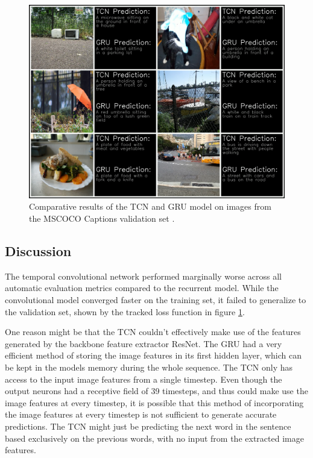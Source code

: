 \documentclass[a4paper, twoside]{article}
\begin{document}
\begin{figure}
\begin{center}
    \includegraphics[width=14cm]{captionsnew.png}\caption{Comparative results of the TCN and GRU model on images from the MSCOCO Captions validation set \cite{mscoco}.} \label{figimagecaptioning}
\end{center}
\end{figure}

\subsection{Discussion}
The temporal convolutional network performed marginally worse across all automatic evaluation metrics compared to the recurrent model. While the convolutional model converged faster on the training set, it failed to generalize to the validation set, shown by the tracked loss function in figure \ref{figimagecaptioning}.

One reason might be that the TCN couldn't effectively make use of the features generated by the backbone feature extractor ResNet. The GRU had a very efficient method of storing the image features in its first hidden layer, which can be kept in the models memory during the whole sequence. The TCN only has access to the input image features from a single timestep. Even though the output neurons had a receptive field of 39 timesteps, and thus could make use the image features at every timestep, it is possible that this method of incorporating the image features at every timestep is not sufficient to generate accurate predictions. The TCN might just be predicting the next word in the sentence based exclusively on the previous words, with no input from the extracted image features.
\end{document}
